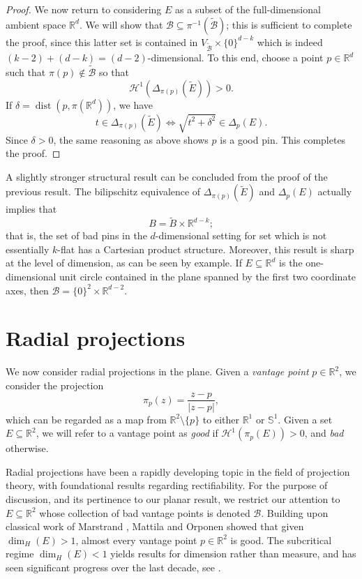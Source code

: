 \documentclass[12pt]{amsart}
\theoremstyle{definition}
\numberwithin{equation}{section}
\newcommand{\R}{\mathbb{R}}
\begin{document}
\begin{proof}
We now return to considering $E$ as a subset of the full-dimensional ambient space $\mathbb{R}^d$. We will show that $\mathcal{B} \subseteq \pi^{-1}(\widetilde{\mathcal{B}})$; this is sufficient to complete the proof, since this latter set is contained in $V_{\widetilde{\mathcal{B}}} \times \{0\}^{d - k}$ which is indeed $(k - 2) + (d - k) = (d-2)$-dimensional. To this end, choose a point $p \in \mathbb{R}^d$ such that $\pi(p) \notin \widetilde{\mathcal{B}}$ so that
$$\mathcal H^1(\Delta_{\pi(p)}(\widetilde E)) > 0.$$
If $\delta = \operatorname{dist}(p, \pi(\mathbb{R}^d))$, we have
$$t \in \Delta_{\pi(p)}(\widetilde E) \iff \sqrt{t^2 + \delta^2} \in \Delta_p(E).$$
Since $\delta > 0$, the same reasoning as above shows $p$ is a good pin. This completes the proof.
\end{proof}

A slightly stronger structural result can be concluded from the proof of the previous result. The bilipschitz equivalence of $\Delta_{\pi(p)}(\widetilde{E})$ and $\Delta_p(E)$ actually implies that $$B = \widetilde{B} \times \mathbb{R}^{d - k};$$ that is, the set of bad pins in the $d$-dimensional setting for set which is not essentially $k$-flat has a Cartesian product structure. Moreover, this result is sharp at the level of dimension, as can be seen by example. If $E \subseteq \mathbb{R}^d$ is the one-dimensional unit circle contained in the plane spanned by the first two coordinate axes, then $\mathcal{B} = \{0\}^2 \times \mathbb{R}^{d - 2}.$

\section{Radial projections}\label{sec:radproj}

We now consider radial projections in the plane. Given a \emph{vantage point} $p \in \mathbb{R}^2$, we consider the projection
$$\pi_p(z) = \frac{z - p}{|z - p|},$$
which can be regarded as a map from $\mathbb{R}^2 \setminus \{p\}$ to either $\mathbb{R}^{1}$ or $\mathbb{S}^1$. Given a set $E \subseteq \mathbb{R}^2$, we will refer to a vantage point as \emph{good} if $\mathcal{H}^1(\pi_p(E)) > 0$, and \emph{bad} otherwise. 

Radial projections have been a rapidly developing topic in the field of projection theory, with foundational results regarding rectifiability. For the purpose of discussion, and its pertinence to our planar result, we restrict our attention to $E\subseteq \mathbb{R}^2$ whose collection of bad vantage points is denoted $\mathcal B$. Building upon classical work of Marstrand \cite{Marstrand1954}, Mattila and Orponen \cite{MO2016,Orponen2017}  showed that given $\dim_H(E) >1$, almost every vantage point $p\in \R^2$ is good. The subcritical regime $\dim_H (E) < 1$ yields results for dimension rather than measure, and has seen significant progress over the last decade, see \cite{BFR2024,BG2024,CS2025,OSW2024}.
\end{document}
